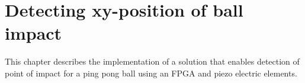 \chapter{Detecting xy-position of ball impact}
This chapter describes the implementation of a solution that enables detection of point of impact for a ping pong ball using an FPGA and piezo electric elements.




